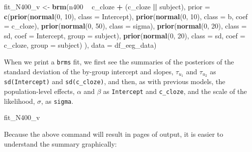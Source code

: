 \documentclass[12pt,]{krantz}
\newenvironment{Shaded}{\begin{snugshade}}{\end{snugshade}}
\newcommand{\KeywordTok}[1]{\textcolor[rgb]{0.13,0.29,0.53}{\textbf{#1}}}
\newcommand{\DataTypeTok}[1]{\textcolor[rgb]{0.13,0.29,0.53}{#1}}
\newcommand{\DecValTok}[1]{\textcolor[rgb]{0.00,0.00,0.81}{#1}}
\newcommand{\StringTok}[1]{\textcolor[rgb]{0.31,0.60,0.02}{#1}}
\newcommand{\OperatorTok}[1]{\textcolor[rgb]{0.81,0.36,0.00}{\textbf{#1}}}
\newcommand{\NormalTok}[1]{#1}
\theoremstyle{definition}
\theoremstyle{definition}
\theoremstyle{definition}
\theoremstyle{remark}
\begin{document}
\begin{Shaded}
\begin{Highlighting}[]
\NormalTok{fit_N400_v <-}\StringTok{ }\KeywordTok{brm}\NormalTok{(n400 }\OperatorTok{~}\StringTok{ }\NormalTok{c_cloze }\OperatorTok{+}\StringTok{ }\NormalTok{(c_cloze }\OperatorTok{||}\StringTok{ }\NormalTok{subject),}
                  \DataTypeTok{prior =}
                      \KeywordTok{c}\NormalTok{(}\KeywordTok{prior}\NormalTok{(}\KeywordTok{normal}\NormalTok{(}\DecValTok{0}\NormalTok{, }\DecValTok{10}\NormalTok{), }\DataTypeTok{class =}\NormalTok{ Intercept),}
                        \KeywordTok{prior}\NormalTok{(}\KeywordTok{normal}\NormalTok{(}\DecValTok{0}\NormalTok{, }\DecValTok{10}\NormalTok{), }\DataTypeTok{class =}\NormalTok{ b, }\DataTypeTok{coef =}\NormalTok{ c_cloze),}
                        \KeywordTok{prior}\NormalTok{(}\KeywordTok{normal}\NormalTok{(}\DecValTok{0}\NormalTok{, }\DecValTok{50}\NormalTok{), }\DataTypeTok{class =}\NormalTok{ sigma),}
                        \KeywordTok{prior}\NormalTok{(}\KeywordTok{normal}\NormalTok{(}\DecValTok{0}\NormalTok{, }\DecValTok{20}\NormalTok{), }\DataTypeTok{class =}\NormalTok{ sd, }\DataTypeTok{coef =}\NormalTok{ Intercept, }\DataTypeTok{group =}\NormalTok{ subject),}
                        \KeywordTok{prior}\NormalTok{(}\KeywordTok{normal}\NormalTok{(}\DecValTok{0}\NormalTok{, }\DecValTok{20}\NormalTok{), }\DataTypeTok{class =}\NormalTok{ sd, }\DataTypeTok{coef =}\NormalTok{ c_cloze, }\DataTypeTok{group =}\NormalTok{ subject)}
\NormalTok{                        ),}
              \DataTypeTok{data =}\NormalTok{ df_eeg_data)}
\end{Highlighting}
\end{Shaded}

When we print a \texttt{brms} fit, we first see the summaries of the
posteriors of the standard deviation of the by-group intercept and
slopes, \(\tau_{u_1}\) and \(\tau_{u_2}\) as \texttt{sd(Intercept)} and
\texttt{sd(c\_cloze)}, and then, as with previous models, the
population-level effects, \(\alpha\) and \(\beta\) as \texttt{Intercept}
and \texttt{c\_cloze}, and the scale of the likelihood, \(\sigma\), as
\texttt{sigma}.

\begin{Shaded}
\begin{Highlighting}[]
\NormalTok{fit_N400_v}
\end{Highlighting}
\end{Shaded}

Because the above command will result in pages of output, it is easier
to understand the summary graphically:
\end{document}
